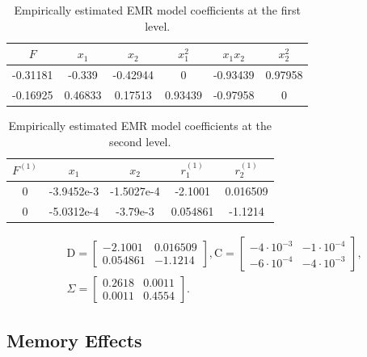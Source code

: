 \documentclass[12pt]{article}
\begin{document}
\begin{table}[H]
	\centering
	\caption{\label{table coeffs emr l1 epsilon 1}Empirically estimated EMR model coefficients at the first level.}
	\begin{tabular}{cccccc}
		$F$ & $x_1$ & $x_2$ & $x_1^2$ & $x_1x_2$ & $x_2^2$ \\ 
		\hline 
-0.31181 & -0.339 & -0.42944 & 0 & -0.93439 & 0.97958 \\ 
-0.16925 & 0.46833 & 0.17513 & 0.93439 & -0.97958 & 0 \\ 
		\hline 
	\end{tabular}
\end{table}

\begin{table}[H]
	\centering
	\caption{Empirically estimated EMR model coefficients at the second level.}
	\begin{tabular}{ccccc}
		$F^{(1)}$ & $x_1$ & $x_2$ & $r^{(1)}_1$ & $r^{(1)}_2$  \\ 
		\hline 
0 & -3.9452e-3 & -1.5027e-4 & -2.1001 & 0.016509  \\ 
0 & -5.0312e-4 & -3.79e-3 & 0.054861 & -1.1214  \\ 
		\hline 
	\end{tabular}
\end{table}


\begin{align}
	&\mathrm{D}=\begin{bmatrix}
-2.1001 & 0.016509  \\ 
0.054861 & -1.1214 
	\end{bmatrix} , \mathrm{C}=\begin{bmatrix}
-4\cdot 10^{-3} & -1\cdot 10^{-4} \\
-6\cdot 10^{-4} & -4\cdot 10^{-3}
	\end{bmatrix}, 
	\\\label{cov mat emr epsilon 1}
	&\Sigma =\begin{bmatrix}
	0.2618 & 0.0011  \\ 
	0.0011 & 0.4554
	\end{bmatrix}.
\end{align}

\subsection{Memory Effects}
\end{document}
